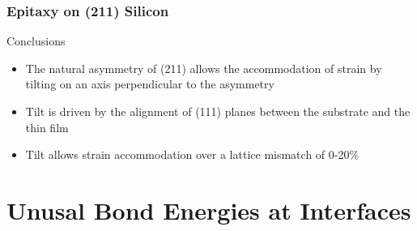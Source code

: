 \documentclass[]{beamer}%
\begin{document}
\begin{frame}
    \frametitle{Epitaxy on (211) Silicon}
    \begin{block}{Conclusions}
        \begin{itemize}[<+-| alert@+>]
            \item The natural asymmetry of (211) allows the accommodation of strain  by tilting on an axis perpendicular to the asymmetry
            \item Tilt is driven by the alignment of (111) planes between the substrate and the thin film
            \item Tilt allows strain accommodation over a lattice mismatch of 0-20\%
        \end{itemize}
    \end{block}
\end{frame}

\section{Unusal Bond Energies at Interfaces}
\end{document}

